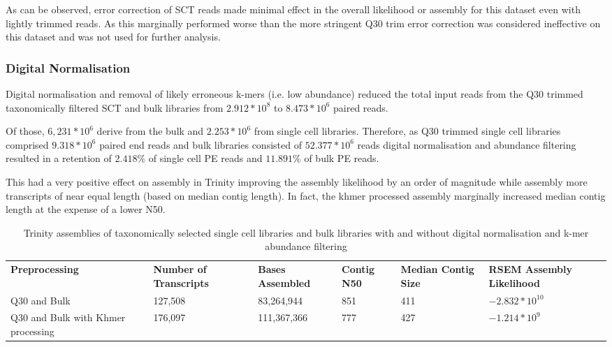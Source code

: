 As can be observed, error correction of SCT reads made minimal effect in the overall likelihood
or assembly for this dataset even with lightly trimmed reads. As this marginally
performed worse than the more stringent Q30 trim error correction was considered
ineffective on this dataset and was not used for further analysis.

\subsubsection{Digital Normalisation} 

Digital normalisation and removal of likely erroneous k-mers (i.e. low abundance) 
reduced the total input reads from the Q30 trimmed taxonomically
filtered SCT and bulk libraries from 
\(2.912*10^{8}\) to \(8.473*10^6\) paired reads.

Of those, \(6,231*10^{6}\) derive from the bulk and \(2.253*10^6\) 
from single cell libraries. 
Therefore, as Q30 trimmed single cell libraries comprised
\(9.318*10^{6}\) paired end reads and bulk libraries 
consisted of \(52.377*10^6\) reads digital normalisation
and abundance filtering resulted in a retention of 
\(2.418\%\) of single cell PE reads and \(11.891\%\) of
bulk PE reads.

This had a very positive effect on assembly in Trinity improving the assembly likelihood
by an order of magnitude while assembly more transcripts of near equal length (based on
median contig length).  In fact, the khmer processed assembly marginally increased
median contig length at the expense of a lower N50. 

\begin{table}[h]
     \begin{tabular}{@{}|l||l|l|l|l|l|@{}}
         \cmidrule(r){1-6} \cmidrule(l){8-8}
         \textbf{Preprocessing} & \textbf{Number of Transcripts} & \textbf{Bases Assembled} & \textbf{Contig N50} & \textbf{Median Contig Size} & \textbf{RSEM Assembly Likelihood} \\
         \cmidrule{}
         Q30 and Bulk &  127,508 & 83,264,944 & 851 & 411 & \(-2.832 * 10^{10}\) \\
         Q30 and Bulk with Khmer processing & 176,097 &  111,367,366  & 777 & 427 & \(-1.214*10^{9}\) \\  
    \end{tabular}
    \caption{Trinity assemblies of taxonomically selected single cell libraries
        and bulk libraries with and without digital normalisation and k-mer
        abundance filtering
    }
    \label{tab:diginorm_assembly}
\end{table}

